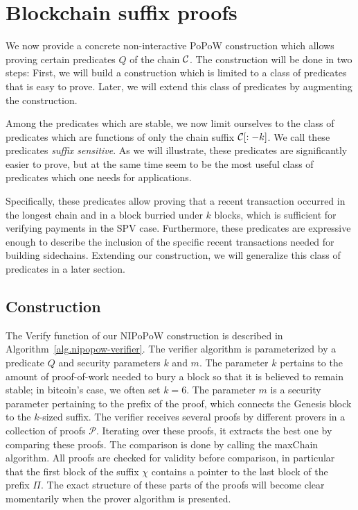 \section{Blockchain suffix proofs}

We now provide a concrete non-interactive PoPoW construction which allows
proving certain predicates $Q$ of the chain $\mathcal{C}$. The construction will
be done in two steps: First, we will build a construction which is limited to
a class of predicates that is easy to prove. Later, we will extend this class
of predicates by augmenting the construction.

Among the predicates which are stable, we now limit ourselves to the class of
predicates which are functions of only the chain suffix $\mathcal{C}[:-k]$. We call
these predicates \textit{suffix sensitive}. As we will illustrate, these
predicates are significantly easier to prove, but at the same time seem to be
the most useful class of predicates which one needs for applications.

Specifically, these predicates allow proving that a recent transaction occurred
in the longest chain and in a block burried under $k$ blocks, which is
sufficient for verifying payments in the SPV case. Furthermore, these
predicates are expressive enough to describe the inclusion of the specific
recent transactions needed for building sidechains. Extending our construction,
we will generalize this class of predicates in a later section.

\subsection{Construction}

The \textsf{Verify} function of our NIPoPoW construction is described in
Algorithm~\ref{alg.nipopow-verifier}. The verifier algorithm is parameterized
by a predicate $Q$ and security parameters $k$ and $m$. The parameter $k$
pertains to the amount of proof-of-work needed to bury a block so that it is
believed to remain stable; in bitcoin's case, we often set $k = 6$. The
parameter $m$ is a security parameter pertaining to the prefix of the proof,
which connects the Genesis block to the $k$-sized suffix.  The verifier
receives several proofs by different provers in a collection of proofs
$\mathcal{P}$. Iterating over these proofs, it extracts the best one by
comparing these proofs. The comparison is done by calling the maxChain
algorithm. All proofs are checked for validity before comparison, in particular
that the first block of the suffix $\chi$ contains a pointer to the last block
of the prefix $\Pi$. The exact structure of these parts of the proofs will
become clear momentarily when the prover algorithm is presented.

